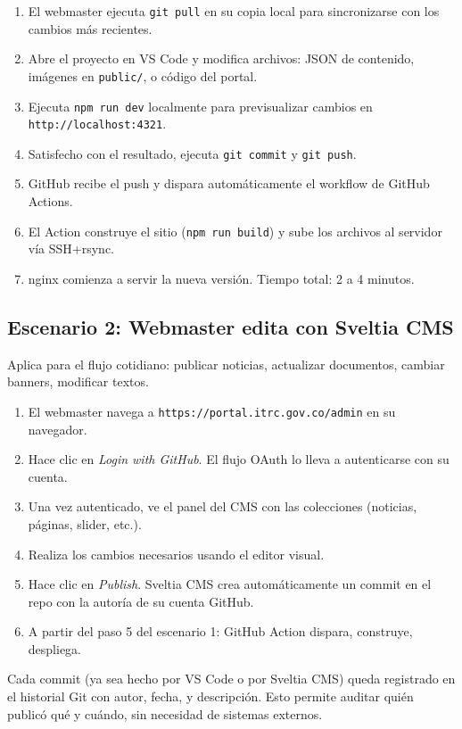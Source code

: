 \documentclass[11pt,a4paper]{article}
\begin{document}
\begin{enumerate}[leftmargin=*]
  \item El webmaster ejecuta \texttt{git pull} en su copia local para sincronizarse con los cambios más recientes.
  \item Abre el proyecto en VS Code y modifica archivos: JSON de contenido, imágenes en \texttt{public/}, o código del portal.
  \item Ejecuta \texttt{npm run dev} localmente para previsualizar cambios en \texttt{http://localhost:4321}.
  \item Satisfecho con el resultado, ejecuta \texttt{git commit} y \texttt{git push}.
  \item GitHub recibe el push y dispara automáticamente el workflow de GitHub Actions.
  \item El Action construye el sitio (\texttt{npm run build}) y sube los archivos al servidor vía SSH+rsync.
  \item nginx comienza a servir la nueva versión. Tiempo total: 2 a 4 minutos.
\end{enumerate}

\subsection{Escenario 2: Webmaster edita con Sveltia CMS}

Aplica para el flujo cotidiano: publicar noticias, actualizar documentos, cambiar banners, modificar textos.

\begin{enumerate}[leftmargin=*]
  \item El webmaster navega a \texttt{https://portal.itrc.gov.co/admin} en su navegador.
  \item Hace clic en \textit{Login with GitHub}. El flujo OAuth lo lleva a autenticarse con su cuenta.
  \item Una vez autenticado, ve el panel del CMS con las colecciones (noticias, páginas, slider, etc.).
  \item Realiza los cambios necesarios usando el editor visual.
  \item Hace clic en \textit{Publish}. Sveltia CMS crea automáticamente un commit en el repo con la autoría de su cuenta GitHub.
  \item A partir del paso 5 del escenario 1: GitHub Action dispara, construye, despliega.
\end{enumerate}

\begin{callout}[title=Trazabilidad]
Cada commit (ya sea hecho por VS Code o por Sveltia CMS) queda registrado en el historial Git con autor, fecha, y descripción. Esto permite auditar quién publicó qué y cuándo, sin necesidad de sistemas externos.
\end{callout}
\end{document}
